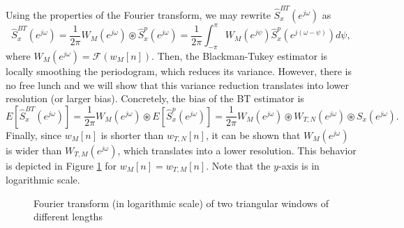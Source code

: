 Using the properties of the Fourier transform, we may rewrite $\hat{S}_x^{BT}(e^{j \omega})$ as
\begin{equation*}
\hat{S}_x^{BT}(e^{j \omega}) = \frac{1}{2 \pi} W_M(e^{j \omega}) \circledast \hat{S}_x^{p}(e^{j \omega}) = \frac{1}{2 \pi} \int_{-\pi}^{\pi} W_{M}(e^{j \psi}) \hat{S}_x^{p}(e^{j (\omega - \psi)}) d \psi,
\end{equation*} 
where $W_M(e^{j \omega}) = \mathcal{F}(w_M[n])$. Then, the Blackman-Tukey estimator is locally smoothing the periodogram, which reduces its variance. However, there is no free lunch and we will show that this variance reduction translates into lower resolution (or larger bias). Concretely, the bias of the BT estimator is
\begin{equation*}
E\left[\hat{S}_x^{BT}(e^{j \omega})\right] = \frac{1}{2 \pi} W_M(e^{j \omega}) \circledast E\left[\hat{S}_x^{p}(e^{j \omega})\right] = \frac{1}{2 \pi} W_M(e^{j \omega}) \circledast  W_{T,N}(e^{j \omega}) \circledast S_x(e^{j \omega}).
\end{equation*}
Finally, since $w_M[n]$ is shorter than $w_{T,N}[n]$, it can be shown that $W_M(e^{j \omega})$ is wider than $W_{T,M}(e^{j \omega})$, which translates into a lower resolution. This behavior is depicted in Figure \ref{fig:comparison_windows} for $w_M[n] = w_{T,M}[n]$. Note that the $y$-axis is in logarithmic scale.
\begin{figure}
	\begin{center}
	\end{center}
	\caption{Fourier transform (in logarithmic scale) of two triangular windows of different lengths}
	\label{fig:comparison_windows}
\end{figure}

